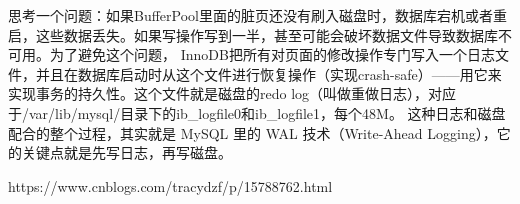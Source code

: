 \documentclass[../../../interview-questions.tex]{subfiles}
\begin{document}
思考一个问题：如果BufferPool里面的脏页还没有刷入磁盘时，数据库宕机或者重启，这些数据丢失。如果写操作写到一半，甚至可能会破坏数据文件导致数据库不可用。为了避免这个问题， InnoDB把所有对页面的修改操作专门写入一个日志文件，并且在数据库启动时从这个文件进行恢复操作（实现crash-safe）——用它来实现事务的持久性。这个文件就是磁盘的redo log（叫做重做日志），对应于/var/lib/mysql/目录下的ib\_logfile0和ib\_logfile1，每个48M。 这种日志和磁盘配合的整个过程，其实就是 MySQL 里的 WAL 技术（Write-Ahead Logging），它的关键点就是先写日志，再写磁盘。

https://www.cnblogs.com/tracydzf/p/15788762.html
\end{document}
